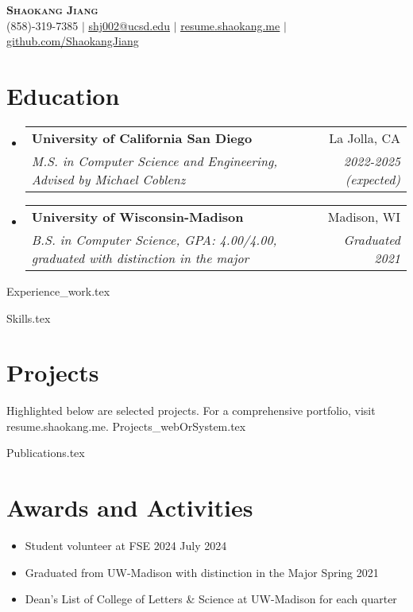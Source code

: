 \documentclass[letterpaper,11pt]{article}
\makeatletter
\newcommand{\resumeItem}[1]{
  \item\small{
    {#1 \vspace{-2pt}}
  }
}
\newcommand{\resumeSubheading}[4]{
  \vspace{-2pt}\item
    \begin{tabular*}{0.97\textwidth}[t]{l@{\extracolsep{\fill}}r}
      \textbf{#1} & #2 \\
      \textit{\small#3} & \textit{\small #4} \\
    \end{tabular*}\vspace{-7pt}
}
\newcommand{\resumeSubHeadingListStart}{\begin{itemize}[leftmargin=0.12in, label={}]}
\newcommand{\resumeSubHeadingListEnd}{\end{itemize}}
\newcommand{\resumeItemListStart}{\begin{itemize}}
\newcommand{\resumeItemListEnd}{\end{itemize}\vspace{-5pt}}
\makeatother
\begin{document}

\begin{center}
    \textbf{\Huge \scshape Shaokang Jiang} \\ \vspace{1pt}
    \small (858)-319-7385 $|$ \href{mailto:shj002@ucsd.edu}{\underline{shj002@ucsd.edu}} $|$ 
    \href{https://resume.shaokang.me}{\underline{resume.shaokang.me}} $|$
    \href{https://github.com/ShaokangJiang}{\underline{github.com/ShaokangJiang}}
\end{center}


\section{Education}
  \resumeSubHeadingListStart
    \resumeSubheading
      {University of California San Diego}{La Jolla, CA}
      {M.S. in Computer Science and Engineering, Advised by Michael Coblenz}{2022-2025 (expected)}
    \resumeSubheading
      {University of Wisconsin-Madison}{Madison, WI}
      {B.S. in Computer Science, GPA: 4.00/4.00, graduated with distinction in the major}{Graduated 2021}
  \resumeSubHeadingListEnd


  
{Experience_work.tex}

%
{Skills.tex}


\section{Projects}

Highlighted below are selected projects. For a comprehensive portfolio, visit resume.shaokang.me.
\vspace{0.5em}
{Projects_webOrSystem.tex}




% 
{Publications.tex}


\section{Awards and Activities}

\resumeItemListStart
\resumeItem{Student volunteer at FSE 2024 \hfill July 2024}
\resumeItem{Graduated from UW-Madison with distinction in the Major \hfill Spring 2021}
\resumeItem{Dean's List of College of Letters \& Science at UW-Madison for each quarter}
\resumeItemListEnd


\end{document}
